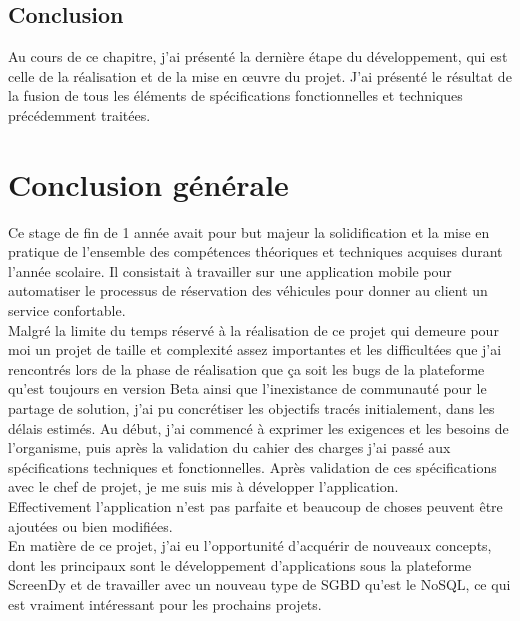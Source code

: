 \documentclass[12pt,a4paper]{report}
\begin{document}
	\section{Conclusion}
Au cours de ce chapitre, j'ai présenté la dernière étape du développement, qui est
celle de la réalisation et de la mise en œuvre du projet. J'ai présenté le résultat de la fusion
de tous les éléments de spécifications fonctionnelles et techniques précédemment traitées.





		\chapter*{Conclusion générale} 
	Ce stage de fin de 1 année avait pour but majeur la solidification et la mise en
pratique de l’ensemble des compétences théoriques et techniques acquises durant l’année scolaire. Il
consistait à travailler sur une application mobile pour automatiser le processus de réservation des véhicules pour donner au client un service confortable.\\
Malgré la limite du temps réservé à la réalisation de ce projet qui demeure pour moi un projet
de taille et complexité assez importantes et les difficultées que j'ai rencontrés lors de la phase de réalisation que ça soit les bugs de la plateforme qu'est toujours en version Beta ainsi que l'inexistance de communauté pour le partage de solution, j'ai pu concrétiser les objectifs tracés initialement, dans les délais estimés. Au début, j'ai commencé à exprimer les exigences et les besoins de l’organisme, puis après la validation du cahier des charges j'ai passé aux
spécifications techniques et fonctionnelles. Après validation de ces spécifications avec le chef de
projet, je me suis mis à développer l'application.\\
Effectivement l'application n'est pas parfaite et beaucoup de choses peuvent être ajoutées ou bien modifiées.\\
En matière de ce projet, j'ai eu l’opportunité d’acquérir de nouveaux concepts, dont les principaux sont le développement d'applications sous la plateforme ScreenDy et de travailler avec un nouveau type de SGBD qu'est le NoSQL, ce qui est vraiment intéressant pour les prochains
projets.\\
	
\end{document}
